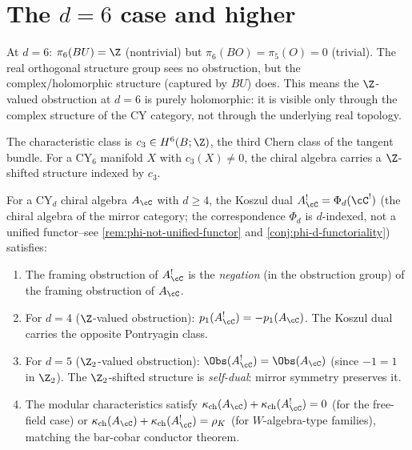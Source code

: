 \section{The \texorpdfstring{$d = 6$}{d = 6} case and higher}
\label{sec:d6-and-higher}

\begin{remark}[\texorpdfstring{$d = 6$}{d = 6}: \texorpdfstring{$BU$}{BU} vs \texorpdfstring{$BO$}{BO} discrepancy]
\label{rem:d6-discrepancy}
At $d = 6$: $\pi_6(BU) = \Z$ (nontrivial) but $\pi_6(BO) = \pi_5(O) = 0$ (trivial). The real orthogonal structure group sees no obstruction, but the complex/holomorphic structure (captured by $BU$) does. This means the $\Z$-valued obstruction at $d = 6$ is purely holomorphic: it is visible only through the complex structure of the CY category, not through the underlying real topology.

The characteristic class is $c_3 \in H^6(B; \Z)$, the third Chern class of the tangent bundle. For a CY$_6$ manifold $X$ with $c_3(X) \neq 0$, the chiral algebra carries a $\Z$-shifted structure indexed by $c_3$.
\end{remark}


\begin{conjecture}[\texorpdfstring{$\En$}{E-n}-Koszul duality at \texorpdfstring{$d \geq 4$}{d >= 4}]
\label{conj:en-koszul-higher}
\ClaimStatusConjectured
For a CY$_d$ chiral algebra $A_\cC$ with $d \geq 4$, the Koszul dual $A_\cC^! = \Phi_d(\cC^!)$ (the chiral algebra of the mirror category; the correspondence $\Phi_d$ is $d$-indexed, not a unified functor--see \ref{rem:phi-not-unified-functor} and \ref{conj:phi-d-functoriality}) satisfies:
\begin{enumerate}[label=\textup{(\roman*)}]
 \item The framing obstruction of $A_\cC^!$ is the \emph{negation} (in the obstruction group) of the framing obstruction of $A_\cC$.
 \item For $d = 4$ ($\Z$-valued obstruction): $p_1(A_\cC^!) = -p_1(A_\cC)$. The Koszul dual carries the opposite Pontryagin class.
 \item For $d = 5$ ($\Z_2$-valued obstruction): $\Obs(A_\cC^!) = \Obs(A_\cC)$ (since $-1 = 1$ in $\Z_2$). The $\Z_2$-shifted structure is \emph{self-dual}: mirror symmetry preserves it.
 \item The modular characteristics satisfy $\kappa_{\mathrm{ch}}(A_\cC) + \kappa_{\mathrm{ch}}(A_\cC^!) = 0$ (for the free-field case) or $\kappa_{\mathrm{ch}}(A_\cC) + \kappa_{\mathrm{ch}}(A_\cC^!) = \rho_K$ (for $W$-algebra-type families), matching the bar-cobar conductor theorem.
\end{enumerate}
\end{conjecture}


